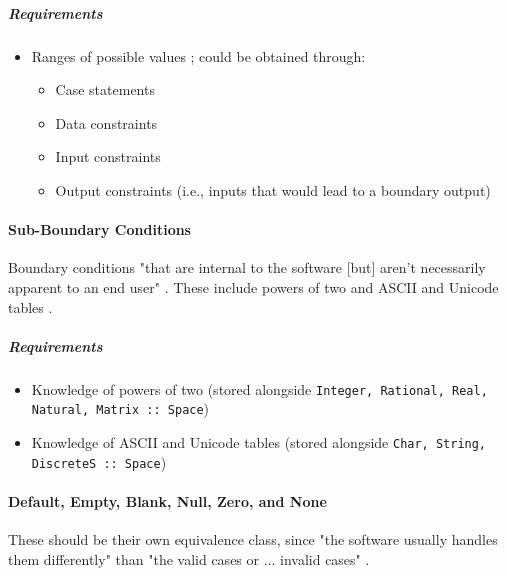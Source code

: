 
\subparagraph{Requirements}
\begin{itemize}
      \item Ranges of possible values \cite[p.~67, 73]{patton_software_2006};
            could be obtained through:
            \begin{itemize}
                  \item Case statements
                  \item Data constraints
                  \item Input constraints
                  \item Output constraints (i.e., inputs that would lead to a
                        boundary output)
            \end{itemize}
\end{itemize}

\paragraph{Sub-Boundary Conditions \cite[p.~75-77]{patton_software_2006}}

Boundary conditions "that are internal to the software [but] aren't necessarily
apparent to an end user" \cite[p.~75]{patton_software_2006}. These include
powers of two \cite[p.~75-76]{patton_software_2006} and ASCII and Unicode tables
\cite[p.~76-77]{patton_software_2006}.

\subparagraph{Requirements}
\begin{itemize}
      \item Knowledge of powers of two \cite[p.~75-76]{patton_software_2006}
            (stored alongside \texttt{Integer, Rational, Real, Natural, Matrix
                  :: Space})
      \item Knowledge of ASCII and Unicode tables \cite[p.~76-77]{patton_software_2006}
            (stored alongside \texttt{Char, String, DiscreteS :: Space})
\end{itemize}

\paragraph{Default, Empty, Blank, Null, Zero, and None
      \cite[p.~77-78]{patton_software_2006}}

These should be their own equivalence class, since "the software usually
handles them differently" than "the valid cases or ... invalid cases"
\cite[p.~78]{patton_software_2006}.

